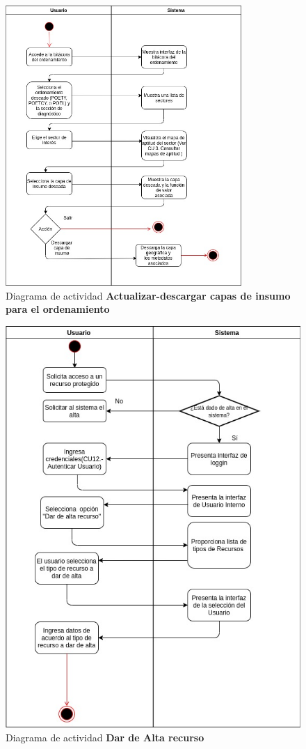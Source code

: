 \pagebreak
\begin{figure}[h]
\centering
\caption{Diagrama de actividad \textbf{Actualizar-descargar capas de insumo para el ordenamiento}}\label{fig:priorReq}
\includegraphics[width=0.8\textwidth, height=.5\textwidth]{images/dic_act_consultardescargar_capas_insumo_ordenamiento}
\end{figure}

\useportrait
\restoregeometry


\pagebreak
\begin{figure}[h]
\centering
\caption{Diagrama de actividad \textbf{Dar de Alta recurso}}
\label{fig:priorReq}
\includegraphics[width=1\textwidth, height=1.5\textwidth]{images/diag_act_alta_recurso}
\end{figure}

